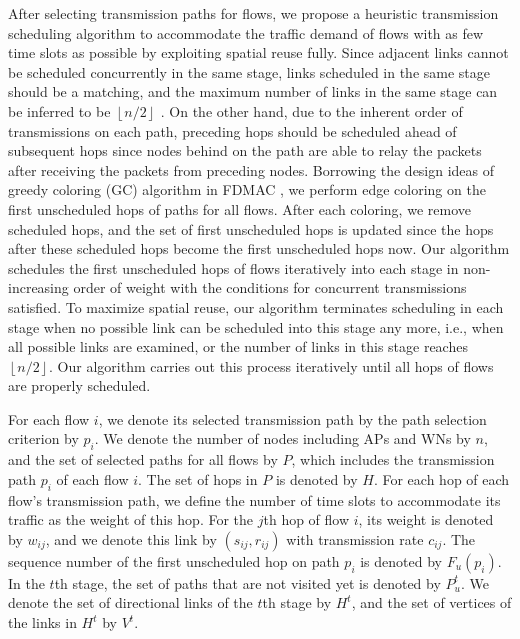 \documentclass[journal]{IEEEtran}
\begin{document}
After selecting transmission paths for flows, we propose a heuristic transmission scheduling algorithm to
accommodate the traffic demand of flows with as few time slots as possible by exploiting spatial reuse fully. Since adjacent links cannot be scheduled concurrently in the same stage, links scheduled in the
same stage should be a matching, and the maximum number of links in
the same stage can be inferred to be $\left\lfloor {n/2} \right\rfloor $ \cite{mao}. On the other hand, due to the
inherent order of transmissions on each path, preceding hops should be scheduled ahead of
subsequent hops since nodes behind on the path are able to relay the packets after receiving the packets from preceding nodes. Borrowing the design ideas of greedy coloring (GC) algorithm in FDMAC \cite{mao},
we perform edge coloring on the first unscheduled hops of paths for all flows. After each coloring,
we remove scheduled hops, and the set of first unscheduled hops is updated since the hops after
these scheduled hops become the first unscheduled hops now. Our algorithm schedules the
first unscheduled hops of flows iteratively into each stage in non-increasing order of weight with the conditions for
concurrent transmissions satisfied. To maximize spatial reuse, our
algorithm terminates scheduling in each stage when no possible link can be scheduled into this stage any more, i.e., when all
possible links are examined, or the number of links in this stage reaches $\left\lfloor {n/2}
\right\rfloor $. Our algorithm carries out this process iteratively until all hops of flows are
properly scheduled.



For each
flow $i$, we denote its selected transmission path by the path selection criterion by $p_i$. We denote the number of nodes including APs and WNs by $n$, and the set of
selected paths for all flows by $P$, which includes the transmission path $p_i$ of each flow $i$.
The set of hops in $P$ is denoted by $H$. For each
hop of each flow's transmission path, we define the number of time slots to accommodate its traffic
as the weight of this hop. For the $j$th hop of flow $i$, its weight is denoted by $w_{ij}$, and we
denote this link by $(s_{ij},r_{ij})$ with transmission rate $c_{ij}$. The sequence number of the
first unscheduled hop on path $p_i$ is denoted by $F_u(p_i)$. In the $t$th stage, the set of paths
that are not visited yet is denoted by $P_u^{t}$. We denote the set of directional links of the
$t$th stage by $H^t$, and the set of vertices of the links in $H^t$ by $V^t$.
\end{document}
